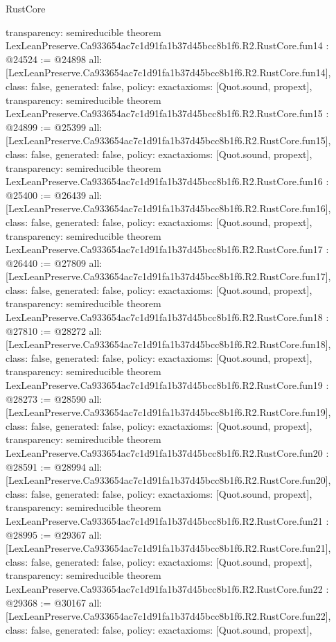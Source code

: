 \begin{lexlean}{RustCore}
\begin{coremodule}
{  transparency: semireducible
}
theorem LexLeanPreserve.Ca933654ac7c1d91fa1b37d45bcc8b1f6.R2.RustCore.fun14 : @24524 := @24898 {
  all: [LexLeanPreserve.Ca933654ac7c1d91fa1b37d45bcc8b1f6.R2.RustCore.fun14],
  class: false,
  generated: false,
  policy: exact{axioms: [Quot.sound, propext]},
  transparency: semireducible
}
theorem LexLeanPreserve.Ca933654ac7c1d91fa1b37d45bcc8b1f6.R2.RustCore.fun15 : @24899 := @25399 {
  all: [LexLeanPreserve.Ca933654ac7c1d91fa1b37d45bcc8b1f6.R2.RustCore.fun15],
  class: false,
  generated: false,
  policy: exact{axioms: [Quot.sound, propext]},
  transparency: semireducible
}
theorem LexLeanPreserve.Ca933654ac7c1d91fa1b37d45bcc8b1f6.R2.RustCore.fun16 : @25400 := @26439 {
  all: [LexLeanPreserve.Ca933654ac7c1d91fa1b37d45bcc8b1f6.R2.RustCore.fun16],
  class: false,
  generated: false,
  policy: exact{axioms: [Quot.sound, propext]},
  transparency: semireducible
}
theorem LexLeanPreserve.Ca933654ac7c1d91fa1b37d45bcc8b1f6.R2.RustCore.fun17 : @26440 := @27809 {
  all: [LexLeanPreserve.Ca933654ac7c1d91fa1b37d45bcc8b1f6.R2.RustCore.fun17],
  class: false,
  generated: false,
  policy: exact{axioms: [Quot.sound, propext]},
  transparency: semireducible
}
theorem LexLeanPreserve.Ca933654ac7c1d91fa1b37d45bcc8b1f6.R2.RustCore.fun18 : @27810 := @28272 {
  all: [LexLeanPreserve.Ca933654ac7c1d91fa1b37d45bcc8b1f6.R2.RustCore.fun18],
  class: false,
  generated: false,
  policy: exact{axioms: [Quot.sound, propext]},
  transparency: semireducible
}
theorem LexLeanPreserve.Ca933654ac7c1d91fa1b37d45bcc8b1f6.R2.RustCore.fun19 : @28273 := @28590 {
  all: [LexLeanPreserve.Ca933654ac7c1d91fa1b37d45bcc8b1f6.R2.RustCore.fun19],
  class: false,
  generated: false,
  policy: exact{axioms: [Quot.sound, propext]},
  transparency: semireducible
}
theorem LexLeanPreserve.Ca933654ac7c1d91fa1b37d45bcc8b1f6.R2.RustCore.fun20 : @28591 := @28994 {
  all: [LexLeanPreserve.Ca933654ac7c1d91fa1b37d45bcc8b1f6.R2.RustCore.fun20],
  class: false,
  generated: false,
  policy: exact{axioms: [Quot.sound, propext]},
  transparency: semireducible
}
theorem LexLeanPreserve.Ca933654ac7c1d91fa1b37d45bcc8b1f6.R2.RustCore.fun21 : @28995 := @29367 {
  all: [LexLeanPreserve.Ca933654ac7c1d91fa1b37d45bcc8b1f6.R2.RustCore.fun21],
  class: false,
  generated: false,
  policy: exact{axioms: [Quot.sound, propext]},
  transparency: semireducible
}
theorem LexLeanPreserve.Ca933654ac7c1d91fa1b37d45bcc8b1f6.R2.RustCore.fun22 : @29368 := @30167 {
  all: [LexLeanPreserve.Ca933654ac7c1d91fa1b37d45bcc8b1f6.R2.RustCore.fun22],
  class: false,
  generated: false,
  policy: exact{axioms: [Quot.sound, propext]},
}
\end{coremodule}
\end{lexlean}
